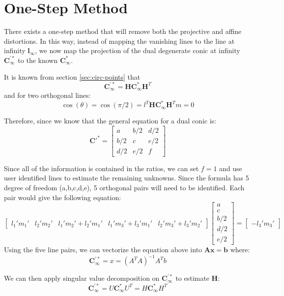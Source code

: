 \documentclass{article}
\begin{document}
\section{One-Step Method}
There exists a one-step method that will remove both the projective and affine distortions. In this way, instead of mapping the vanishing lines to the line at infinity $\boldsymbol{l_\infty}$, we now map the projection of the dual degenerate conic at infinity $\boldsymbol{C_\infty^{'*}}$ to the known $\boldsymbol{C_\infty^{*}}$.

It is known from section \ref{sec:circ-points} that
\[\boldsymbol{C_\infty^{'*}} = \boldsymbol{H} \boldsymbol{C_\infty^{*}} \boldsymbol{H}^T\]
and for two orthogonal lines:
\[\cos(\theta) = \cos(\pi/2) = l^T \boldsymbol{H} \boldsymbol{C_\infty^{*}} \boldsymbol{H}^T m = 0\]

Therefore, since we know that the general equation for a dual conic is:
\[\boldsymbol{C'^*} = \begin{bmatrix}
    a & b/2 & d/2 \\
    b/2 & c & e/2 \\
    d/2 & e/2 & f
\end{bmatrix}\]

Since all of the information is contained in the ratios, we can set $f=1$ and use user identified lines to estimate the remaining unknowns. Since the formula has 5 degree of freedom (a,b,c,d,e), 5 orthogonal pairs will need to be identified. Each pair would give the following equation:
\[\begin{bmatrix}
    l_1 ' m_1 ' & l_2 ' m_2 ' &  l_1 ' m_2 ' + l_2 ' m_1 ' & l_1 ' m_3 ' + l_3 ' m_1 ' & l_2 ' m_3' + l_3 ' m_2 '
\end{bmatrix}\begin{bmatrix}
    a \\ c \\ b/2 \\ d/2 \\ e/2
\end{bmatrix} = \begin{bmatrix}
    -l_3 ' m_3 '
\end{bmatrix}\]
Using the five line pairs, we can vectorize the equation above into $\boldsymbol{A x} = \boldsymbol{b}$ where:
\[\boldsymbol{C_\infty^{'*}} = x = \left(A^TA\right)^{-1} A^Tb\]

We can then apply singular value decomposition on $\boldsymbol{C_\infty^{'*}}$ to estimate $\boldsymbol{H}$:
\[\boldsymbol{C_\infty^{'*}} = U \boldsymbol{C_\infty^{*}} U^T = H \boldsymbol{C_\infty^{*}} H^T\]
\end{document}
